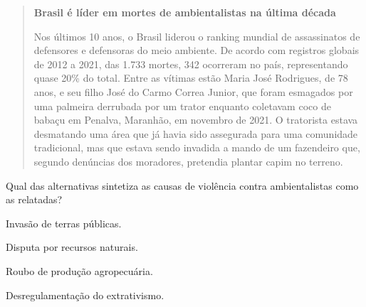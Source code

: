 \begin{quote}
\textbf{Brasil é líder em mortes de ambientalistas na última década}

Nos últimos 10 anos, o Brasil liderou o ranking mundial de assassinatos de defensores e defensoras do meio ambiente. De acordo com registros globais de 2012 a 2021, das 1.733 mortes, 342 ocorreram no país, representando quase 20\% do total. Entre as vítimas estão Maria José Rodrigues, de 78 anos, e seu filho José do Carmo Correa Junior, que foram esmagados por uma palmeira derrubada por um trator enquanto coletavam coco de babaçu em Penalva, Maranhão, em novembro de 2021. O tratorista estava desmatando uma área que já havia sido assegurada para uma comunidade tradicional, mas que estava sendo invadida a mando de um fazendeiro que, segundo denúncias dos moradores, pretendia plantar capim no terreno.

\end{quote}

Qual das alternativas sintetiza as causas de violência contra
ambientalistas como as relatadas?

\begin{escolha}
\item  Invasão de terras públicas.

\item  Disputa por recursos naturais.

\item  Roubo de produção agropecuária.

\item  Desregulamentação do extrativismo.
\end{escolha}
